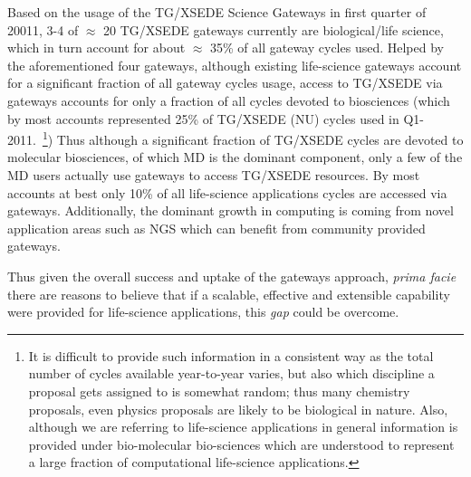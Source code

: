 \documentclass[]{svjour3}
\begin{document}
 
Based on the usage of the TG/XSEDE Science Gateways in first quarter
of 20011, 3-4 of $\approx$ 20 TG/XSEDE gateways currently are
biological/life science, which in turn account for about $\approx$
35\% of all gateway cycles used. Helped by the aforementioned four
gateways, although existing life-science gateways account for a
significant fraction of all gateway cycles usage, access to TG/XSEDE
via gateways accounts for only %
a fraction of all cycles devoted to biosciences
(which by most accounts represented 25\% of TG/XSEDE (NU) cycles used
in Q1-2011.~\footnote{It is difficult to provide such information in a
  consistent way as the total number of cycles available year-to-year
  varies, but also which discipline a proposal gets assigned to is
  somewhat random; thus many chemistry proposals, even physics
  proposals are likely to be biological in nature. Also, although we
  are referring to life-science applications in general information is
  provided under bio-molecular bio-sciences which are understood to
  represent a large fraction of computational life-science
  applications.})  Thus although a significant fraction of TG/XSEDE
cycles are devoted to molecular biosciences, of which MD is the
dominant component, only a few of the MD users actually use gateways
to access TG/XSEDE resources.  By most accounts at best only 10\% of
all life-science applications cycles are accessed via gateways.
Additionally, the dominant growth in computing is coming from novel
application areas such as NGS which can benefit from community
provided gateways.

Thus given the overall success and uptake of the gateways approach,
{\it prima facie} there are reasons to believe that if a scalable,
effective and extensible capability were provided for life-science
applications, this {\it gap} could be overcome.



\end{document}
